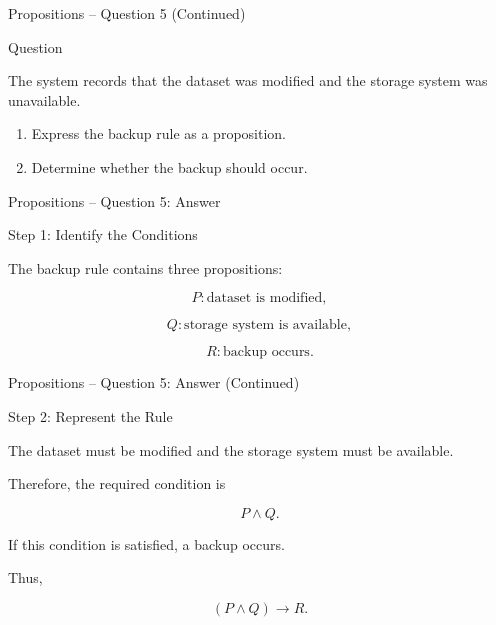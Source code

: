 \begin{frame}{Propositions -- Question 5 (Continued)}

\begin{block}{Question}

The system records that the dataset was modified and the storage system
was unavailable.

\medskip

\begin{enumerate}
\item Express the backup rule as a proposition.
\item Determine whether the backup should occur.
\end{enumerate}

\end{block}

\end{frame}


\begin{frame}{Propositions -- Question 5: Answer}

\begin{exampleblock}{Step 1: Identify the Conditions}

The backup rule contains three propositions:

$$
P:\text{dataset is modified},
$$

$$
Q:\text{storage system is available},
$$

$$
R:\text{backup occurs}.
$$

\end{exampleblock}

\end{frame}


\begin{frame}{Propositions -- Question 5: Answer (Continued)}

\begin{exampleblock}{Step 2: Represent the Rule}

The dataset must be modified and the storage system must be available.

Therefore, the required condition is

$$
P\land Q.
$$

If this condition is satisfied, a backup occurs.

Thus,

$$
\boxed{(P\land Q)\rightarrow R}.
$$

\end{exampleblock}

\end{frame}

